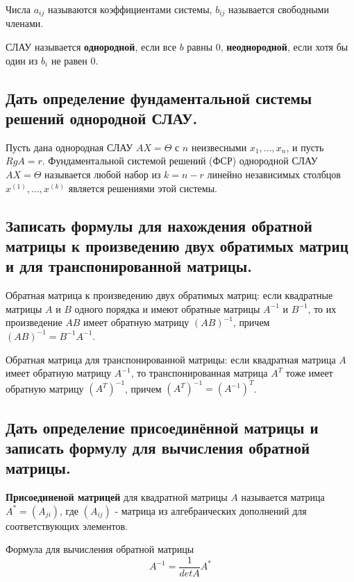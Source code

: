Числа $a_{ij}$ называются коэффициентами системы,
$b_{ij}$ называется свободными членами.

СЛАУ называется {\bf{однородной}}, если все $b$ равны $0$, {\bf{неоднородной}}, если хотя бы один из $b_i$ не равен $0$.

\subsection{Дать определение фундаментальной системы решений однородной СЛАУ.}

Пусть дана однородная СЛАУ $AX = \Theta$ с $n$ неизвесными $x_1, ..., x_n$, и пусть $RgA = r$. Фундаментальной системой решений (ФСР) однородной СЛАУ $AX = \Theta$ называется любой набор из $k = n - r$ линейно независимых столбцов $x^{(1)}, ..., x^{(k)}$ является решениями этой системы.

\subsection{Записать формулы для нахождения обратной матрицы к произведению двух обратимых матриц и для транспонированной матрицы.}

Обратная матрица к произведению двух обратимых матриц: если квадратные матрицы $A$ и $B$ одного порядка и имеют обратные матрицы $A^{-1}$ и $B^{-1}$, то их произведение $AB$ имеет обратную матрицу $(AB)^{-1}$, причем $(AB)^{-1} = B^{-1}A^{-1}$.

\vspace*{15pt}

Обратная матрица для транспонированной матрицы: если квадратная матрица $A$ имеет обратную матрицу $A^{-1}$, то транспонированная матрица $A^T$ тоже имеет обратную матрицу $(A^T)^{-1}$, причем $(A^T)^{-1} = (A^{-1})^T$.

\subsection{Дать определение присоединённой матрицы и записать формулу для вычисления обратной матрицы.}

{\bf{Присоединеной матрицей}} для квадратной матрицы $A$ называется матрица $A^* = (A_{ji})$, где $(A_{ij})$ - матрица из алгебраических дополнений для соответствующих элементов.

Формула для вычисления обратной матрицы
$$A^{-1} = \frac{1}{detA}A^*$$

\vspace*{15pt}
\vspace*{15pt}


